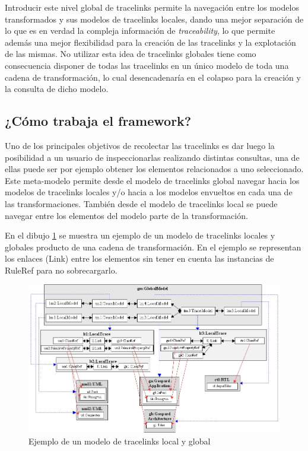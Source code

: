 \documentclass[a4paper,12pt,oneside,spanish]{book}
\begin{document}
Introducir este nivel global de tracelinks permite la navegación entre los modelos transformados y sus modelos de tracelinks locales, dando una mejor separación de lo que es en verdad la compleja información de \textit{traceability}, lo que permite además una mejor flexibilidad para la creación de las tracelinks y la explotación de las mismas. No utilizar esta idea de tracelinks globales tiene como consecuencia disponer de todas las tracelinks en un único modelo de toda una cadena de transformación, lo cual desencadenaría en el colapso para la creación y la consulta de dicho modelo.

\subsection{¿Cómo trabaja el framework?}

Uno de los principales objetivos de recolectar las tracelinks es dar luego la posibilidad a un usuario de inspeccionarlas realizando distintas consultas, una de ellas puede ser por ejemplo obtener los elementos relacionados a uno seleccionado. Este meta-modelo permite desde el modelo de tracelinks global navegar hacia los modelos de tracelinks locales y/o hacia a los modelos envueltos en cada una de las transformaciones. También desde el modelo de tracelinks local se puede navegar entre los elementos del modelo parte de la transformación.

En el dibujo \ref{fig:EjemploLocalGlobalMetamodel} se muestra un ejemplo de un modelo de tracelinks locales y globales producto de una cadena de transformación. En el ejemplo se representan los enlaces (Link) entre los elementos sin tener en cuenta las instancias de RuleRef para no sobrecargarlo.

\begin{figure}[hbtp]
\centering
\includegraphics[scale=.46]{./img/EjemploLocalGlobalMetamodel}
\caption{Ejemplo de un modelo de tracelinks local y global}
\label{fig:EjemploLocalGlobalMetamodel}
\end{figure}
\end{document}
